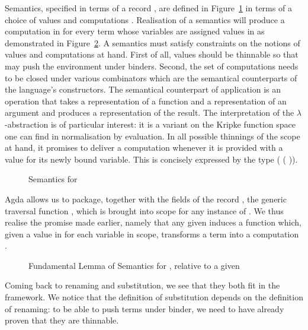 Semantics,
   specified in terms of a record \semrec{},
are defined in Figure~\ref{figure:lamsem} in terms of a choice of values  and
computations . Realisation of a semantics will produce a
computation in  for every term whose variables are assigned
values in  as demonstrated in Figure~\ref{figure:fdmlamsem}.
A semantics must satisfy constraints on the notions of
values  and computations  at hand. First of all,
values should be thinnable so that \semfun{} may push the environment
under binders. Second, the set of computations needs to be closed
under various combinators which are the semantical counterparts of
the language's constructors. The semantical counterpart of application is an operation
that takes a representation of a function and a representation of an
argument and produces a representation of the result.
The interpretation of the $\lambda$-abstraction is of particular interest:
it is a variant on
the Kripke function space one can find in normalisation by evaluation.
In all possible thinnings of the scope at hand, it promises to deliver
a computation whenever it is provided with a value for its newly
bound variable. This is concisely expressed by the type
( ( \AB{$\sigma$}   \AB{$\tau$})).

\begin{figure}[h]
\caption{Semantics for }\label{figure:lamsem}
\end{figure}

Agda allows us to package, together with the fields of the record
\semrec{}, the generic traversal function \semfun{}, which is brought
into scope for any instance of \semrec{}. We thus realise the promise
made earlier, namely that any given {\semrec{} 
  } induces a function which, given a value in
 for each variable in scope, transforms a   term into a
computation .

\begin{figure}[h]
\caption{Fundamental Lemma of Semantics for , relative to a given \semrec{}  }\label{figure:fdmlamsem}
\end{figure}

Coming back to renaming and substitution, we see that they both fit in the
\semrec{} framework. We notice that the definition of substitution depends on
the definition of renaming: to be able to push terms under binder, we need to
have already proven that they are thinnable.

